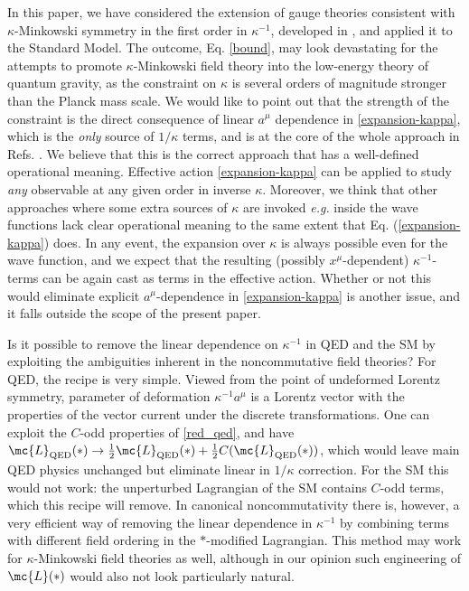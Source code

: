\documentclass[prl,tightenlines]{revtex4}
\begin{document}
In this paper, we have considered the extension of gauge theories consistent with $\kappa$-Minkowski
symmetry in the first order in $\kappa^{-1}$, developed in \cite{Dimitrijevic:2003pn,Dimitrijevic:2005xw}, 
and applied it to the Standard Model. The outcome, Eq. \eqref{bound}, may look devastating 
for the attempts to promote $\kappa$-Minkowski field theory into the low-energy theory of 
quantum gravity, as the constraint on $\kappa$ is several orders of magnitude stronger than the Planck mass scale.
We would like to point out that the 
strength of the constraint is the direct consequence of linear $a^\mu$ dependence in 
\eqref{expansion-kappa}, which is the {\em only} source
of $1/\kappa$ terms, and is at the core of the whole approach in Refs. \cite{Dimitrijevic:2003pn,Dimitrijevic:2005xw}.
We believe that this is the correct approach that has a well-defined operational meaning. Effective action 
\eqref{expansion-kappa} can be applied to study {\em any} observable at any given order in inverse $\kappa$. 
Moreover, we think that other approaches where some extra sources of $\kappa$ are invoked 
{\em e.g.} inside the wave functions \cite{Arzano:2007gr,Arzano:2007ef,Arzano:2007qp} 
lack clear operational meaning to the same extent that 
Eq. (\ref{expansion-kappa}) does. In  any event, the expansion over
$\kappa$ is always possible even for the wave function, and we expect that the 
resulting (possibly $x^\mu$-dependent) $\kappa^{-1}$-terms can be again cast as terms in the 
effective action. Whether or not this would eliminate explicit $a^\mu$-dependence in 
\eqref{expansion-kappa} is another issue, and it falls outside the scope of the present paper.  

Is it possible to remove the linear dependence on $\kappa^{-1}$ in QED and the SM
by exploiting the ambiguities inherent in the noncommutative field theories? 
For QED, the recipe is very simple.
Viewed from the point of undeformed Lorentz symmetry, parameter of deformation $\kappa^{-1} a^\mu$ is a 
Lorentz vector with the properties of the vector current under the discrete transformations. 
One can exploit the $C$-odd properties of \eqref{red_qed}, and have $\mc{L}_{\rm QED}(*) \to \frac12 \mc{L}_{\rm QED}(*)
+ \frac12 C(\mc{L}_{\rm QED}(*))$, which would leave main QED physics unchanged but eliminate 
linear in $1/\kappa$ correction. For the SM this would not work: the unperturbed Lagrangian of the SM 
contains $C$-odd terms, which this recipe will remove. In canonical noncommutativity  there is, however, a very efficient way of 
removing the linear dependence in $\kappa^{-1}$ by combining terms with different field ordering in the
$*$-modified Lagrangian. This method may work for $\kappa$-Minkowski field theories as well, 
although in our opinion such engineering of $\mc{L}(*)$ would also not look particularly natural. 
\end{document}
